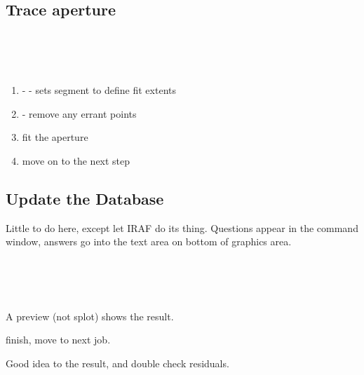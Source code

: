 


\subsection{Trace aperture}

 \\
 \\
 \\

\vspace{-.15cm}
\begin{enumerate}\addtolength{\itemsep}{-0.5\baselineskip}
   \item  {}- - sets segment to define fit extents
   \item  {} - remove any errant points
   \item  {}   fit the aperture
   \item  {} move on to the next step
\end{enumerate}


\subsection{Update the Database}

Little to do here, except let IRAF do its thing. Questions appear
in the command window, answers go into the text area on bottom
of graphics area.


 \\
 \\
 \\

A preview (not splot) shows the result.

 finish, move to next job.

Good idea to  the result, and double check residuals.


